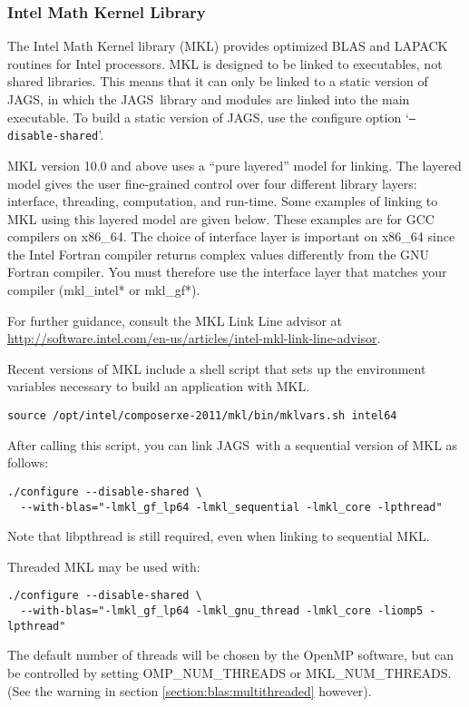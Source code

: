 \documentclass[11pt, a4paper, titlepage]{article}
\newcommand{\JAGS}{\textsf{JAGS}}
\newcommand{\code}[1]{{\bgroup{\normalfont\ttfamily #1}\egroup}}
\newcommand{\samp}[1]{{`\bgroup\normalfont\texttt{#1}'\egroup}}
\let\option=\samp
\begin{document}
\subsubsection{Intel Math Kernel Library}

The Intel Math Kernel library (MKL) provides optimized BLAS and LAPACK
routines for Intel processors.  MKL is designed to be linked to
executables, not shared libraries. This means that it can only be
linked to a static version of \JAGS, in which the \JAGS\ library and
modules are linked into the main executable. To build a static version
of \JAGS, use the configure option \option{--disable-shared}.

MKL version 10.0 and above uses a ``pure layered'' model for linking.
The layered model gives the user fine-grained control over four
different library layers: interface, threading, computation, and
run-time. Some examples of linking to MKL using this layered model are
given below. These examples are for GCC compilers on
\code{x86\_64}. The choice of interface layer is important on
\code{x86\_64} since the Intel Fortran compiler returns complex values
differently from the GNU Fortran compiler. You must therefore use the
interface layer that matches your compiler (\code{mkl\_intel*} or
\code{mkl\_gf*}).

For further guidance, consult the MKL Link Line advisor at
\url{http://software.intel.com/en-us/articles/intel-mkl-link-line-advisor}.

Recent versions of MKL include a shell script that sets up the
environment variables necessary to build an application with MKL.
\begin{verbatim}
source /opt/intel/composerxe-2011/mkl/bin/mklvars.sh intel64
\end{verbatim}

After calling this script, you can link \JAGS\ with a sequential
version of MKL as follows:
\begin{verbatim}
./configure --disable-shared \
  --with-blas="-lmkl_gf_lp64 -lmkl_sequential -lmkl_core -lpthread"
\end{verbatim}
Note that \code{libpthread} is still required, even when linking
to sequential MKL.

Threaded MKL may be used with:
\begin{verbatim}
./configure --disable-shared \
  --with-blas="-lmkl_gf_lp64 -lmkl_gnu_thread -lmkl_core -liomp5 -lpthread"
\end{verbatim}
The default number of threads will be chosen by the OpenMP software,
but can be controlled by setting \code{OMP\_NUM\_THREADS} or
\code{MKL\_NUM\_THREADS}.  (See the warning in section
\ref{section:blas:multithreaded} however).
\end{document}
